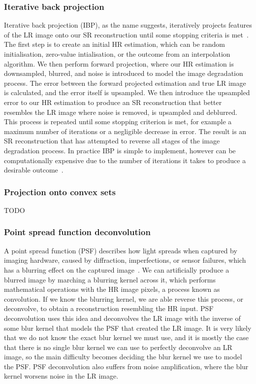 \subsubsection{Iterative back projection}
Iterative back projection (IBP), as the name suggests, iteratively projects features of the LR image onto our SR reconstruction until some stopping criteria is met~\cite{ref}. The first step is to create an initial HR estimation, which can be random initialisation, zero-value intialisation, or the outcome from an interpolation algorithm. We then perform forward projection, where our HR estimation is downsampled, blurred, and noise is introduced to model the image degradation process. The error between the forward projected estimation and true LR image is calculated, and the error itself is upsampled. We then introduce the upsampled error to our HR estimation to produce an SR reconstruction that better resembles the LR image where noise is removed, is upsampled and deblurred. This process is repeated until some stopping criterion is met, for example a maximum number of iterations or a negligible decrease in error. The result is an SR reconstruction that has attempted to reverse all stages of the image degradation process. In practice IBP is simple to implement, however can be computationally expensive due to the number of iterations it takes to produce a desirable outcome~\cite{ref}.

\subsubsection{Projection onto convex sets}
TODO

\subsubsection{Point spread function deconvolution}
A point spread function (PSF) describes how light spreads when captured by imaging hardware, caused by diffraction, imperfections, or sensor failures, which has a blurring effect on the captured image~\cite{ref}. We can artificially produce a blurred image by marching a blurring kernel across it, which performs mathematical operations with the HR image pixels, a process known as convolution. If we know the blurring kernel, we are able reverse this process, or deconvolve, to obtain a reconstruction resembling the HR input. PSF deconvolution uses this idea and deconvolves the LR image with the inverse of some blur kernel that models the PSF that created the LR image. It is very likely that we do not know the exact blur kernel we must use, and it is mostly the case that there is no single blur kernel we can use to perfectly deconvolve an LR image, so the main difficulty becomes deciding the blur kernel we use to model the PSF. PSF deconvolution also suffers from noise amplification, where the blur kernel worsens noise in the LR image.

